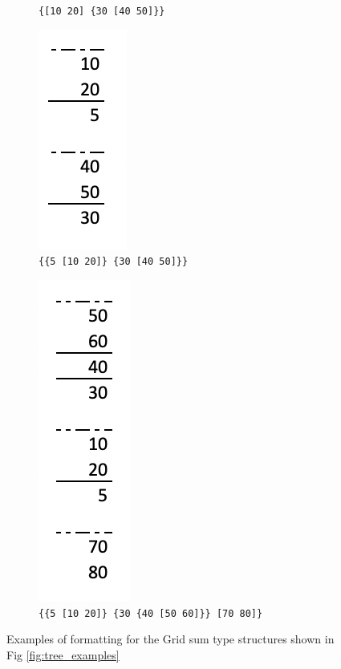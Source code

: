 \documentclass[11pt]{article}
\begin{document}
\begin{figure}[h]
\begin{subfigure}[b]{.45\textwidth}
    		\caption{\texttt{\{[10 20] \{30 [40 50]\}\}}}\label{fig:fd}
    \end{subfigure}
    \begin{subfigure}[b]{.45\textwidth}
    		\centering
    		\includegraphics[scale=.5]{screenshots/format5.png}
    		\caption{\texttt{\{\{5 [10 20]\} \{30 [40 50]\}\}}}\label{fig:fe}
    \end{subfigure}
    \begin{subfigure}[b]{.7\textwidth}
    		\centering
    		\includegraphics[scale=.5]{screenshots/format6.png}
    		\caption{\texttt{\{\{5 [10 20]\} \{30 \{40 [50 60]\}\} [70 80]\}}}\label{fig:ff}
    \end{subfigure}
  \caption{Examples of formatting for the Grid sum type structures shown in Fig \ref{fig:tree_examples}}
  \label{fig:format_examples}
\end{figure}
\end{document}

